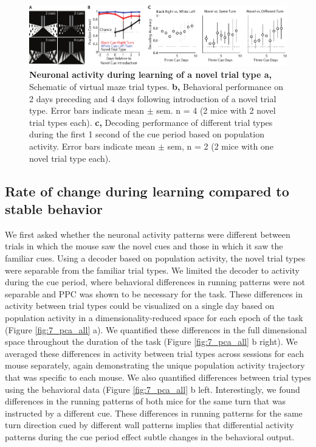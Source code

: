 \begin{figure}
\includegraphics[width=\textwidth]{figures/7_cues.pdf}
\caption[Neuronal activity during learning of a novel trial type]{\textbf{Neuronal activity during learning of a novel trial type a,} Schematic of virtual maze trial types. 
%
\textbf{b,} Behavioral performance on 2 days preceding and 4 days following introduction of a novel trial type. Error bars indicate mean $\pm$ sem. n = 4 (2 mice with 2 novel trial types each).
%
\textbf{c,} Decoding performance of different trial types during the first 1 second of the cue period based on population activity. Error bars indicate mean $\pm$ sem, n = 2 (2 mice with one novel trial type each). 
\label{fig:7_cues}}
\end{figure}


\subsection{Rate of change during learning compared to stable behavior} \label{chap4:decoding}

We first asked whether the neuronal activity patterns were different between trials in which the mouse saw the novel cues and those in which it saw the familiar cues. Using a decoder based on population activity, the novel trial types were separable from the familiar trial types. We limited the decoder to activity during the cue period, where behavioral differences in running patterns were not separable and PPC was shown to be necessary for the task. These differences in activity between trial types could be visualized on a single day based on population activity in a dimensionality-reduced space for each epoch of the task (Figure \ref{fig:7_pca_all} a). We quantified these differences in the full dimensional space throughout the duration of the task (Figure \ref{fig:7_pca_all} b right). We averaged these differences in activity between trial types across sessions for each mouse separately, again demonstrating the unique population activity trajectory that was specific to each mouse. We also quantified differences between trial types using the behavioral data (Figure \ref{fig:7_pca_all} b left. Interestingly, we found differences in the running patterns of both mice for the same turn that was instructed by a different cue. These differences in running patterns for the same turn direction cued by different wall patterns implies that differential activity patterns during the cue period effect subtle changes in the behavioral output.

